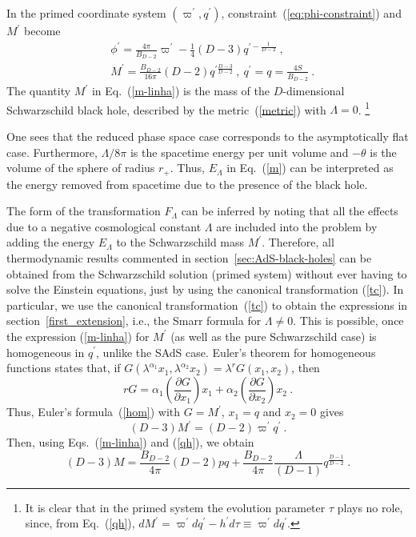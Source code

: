 \documentclass[prd,onecolumn,notitlepage,amsmath,nofootinbib,superscriptaddress,showpacs,showkeys]{revtex4-1}
\begin{document}
In the primed coordinate system $\left(\varpi^{\prime},q^{\prime}\right)$,
constraint~(\ref{eq:phi-constraint}) and $M^{\prime}$ become 
\begin{align}
 & \phi^{\prime}=\frac{4\pi}{B_{D-2}}\varpi^{\prime}-\frac{1}{4}\left(D-3\right)q^{\prime-\frac{1}{D-2}}~,\nonumber \\
 & M^{\prime}=\frac{B_{D-2}}{16\pi}\left(D-2\right)q^{\prime\frac{D-3}{D-2}}~,~q^{\prime}=q=\frac{4S}{B_{D-2}}~.\label{m-linha}
\end{align}
The quantity $M^{\prime}$ in Eq.~(\ref{m-linha}) is the mass of
the $D$-dimensional Schwarzschild black hole, described by the metric~(\ref{metric})
with $\Lambda=0$.%
\footnote{It is clear that in the primed system the evolution parameter $\tau$
plays no role, since, from Eq.~(\ref{qh}), $dM^{\prime}=\varpi^{\prime}dq^{\prime}-h^{\prime}d\tau\equiv\varpi^{\prime}dq^{\prime}$.%
}

One sees that the reduced phase space case corresponds to the asymptotically
flat case. Furthermore, $\Lambda/8\pi$ is the spacetime energy per
unit volume \cite{Joh14} and $-\theta$ is the volume of the sphere
of radius $r_{+}$. Thus, $E_{\Lambda}$ in Eq.~(\ref{m}) can be
interpreted as the energy removed from spacetime due to the presence
of the black hole.

The form of the transformation $F_{\Lambda}$ can be inferred by noting
that all the effects due to a negative cosmological constant $\Lambda$
are included into the problem by adding the energy $E_{\Lambda}$
to the Schwarzschild mass $M^{\prime}$. Therefore, all thermodynamic
results commented in section~\ref{sec:AdS-black-holes} can be obtained
from the Schwarzschild solution (primed system) without ever having
to solve the Einstein equations, just by using the canonical transformation
(\ref{tc}). In particular, we use the canonical transformation~(\ref{tc})
to obtain the expressions in section~\ref{first_extension}, i.e.,
the Smarr formula for $\Lambda\neq0$. This is possible, once the
expression (\ref{m-linha}) for $M^{\prime}$ (as well as the pure
Schwarzschild case) is homogeneous in $q^{\prime}$, unlike the SAdS
case. Euler's theorem for homogeneous functions \cite{kastor2009}
states that, if $G\left(\lambda^{\alpha_{1}}x_{1},\lambda^{\alpha_{2}}x_{2}\right)=\lambda^{r}G\left(x_{1},x_{2}\right)$,
then 
\begin{equation}
rG=\alpha_{1}\left(\frac{\partial G}{\partial x_{1}}\right)x_{1}+\alpha_{2}\left(\frac{\partial G}{\partial x_{2}}\right)x_{2}~.\label{hom}
\end{equation}
Thus, Euler's formula~(\ref{hom}) with $G=M^{\prime}$, $x_{1}=q$
and $x_{2}=0$ gives 
\begin{equation}
\left(D-3\right)M^{\prime}=\left(D-2\right)\varpi^{\prime}q^{\prime}~.
\end{equation}
Then, using Eqs.~(\ref{m-linha}) and (\ref{qh}), we obtain 
\begin{equation}
\left(D-3\right)M=\frac{B_{D-2}}{4\pi}\left(D-2\right)pq+\frac{B_{D-2}}{4\pi}\frac{\Lambda}{\left(D-1\right)}q^{\frac{D-1}{D-2}}~.\label{s1}
\end{equation}
\end{document}
